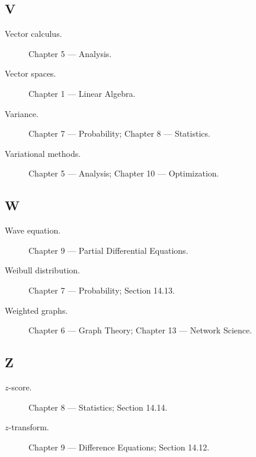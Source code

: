 \subsection*{V}

\begin{description}

\item[Vector calculus.]
Chapter 5 --- Analysis.

\item[Vector spaces.]
Chapter 1 --- Linear Algebra.

\item[Variance.]
Chapter 7 --- Probability;
Chapter 8 --- Statistics.

\item[Variational methods.]
Chapter 5 --- Analysis;
Chapter 10 --- Optimization.

\end{description}

\subsection*{W}

\begin{description}

\item[Wave equation.]
Chapter 9 --- Partial Differential Equations.

\item[Weibull distribution.]
Chapter 7 --- Probability;
Section 14.13.

\item[Weighted graphs.]
Chapter 6 --- Graph Theory;
Chapter 13 --- Network Science.

\end{description}

\subsection*{Z}

\begin{description}

\item[\(z\)-score.]
Chapter 8 --- Statistics;
Section 14.14.

\item[\(z\)-transform.]
Chapter 9 --- Difference Equations;
Section 14.12.

\end{description}

